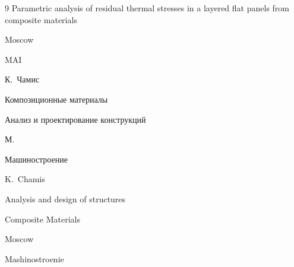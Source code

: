 \begin{thebibliography}{9}
\book Parametric analysis of residual thermal stresses in a layered flat panels from composite materials

\publaddr Moscow

\publ MAI






\ed К.~Чамис

\book Композиционные материалы


\volinfo Анализ и проектирование конструкций

\publaddr М.

\publ Машиностроение



\misctransl

\ed K.~Chamis

\bookvol Analysis and design of structures

\book Composite Materials 

\publaddr Moscow

\publ Mashinostroenie




















\end{thebibliography}
